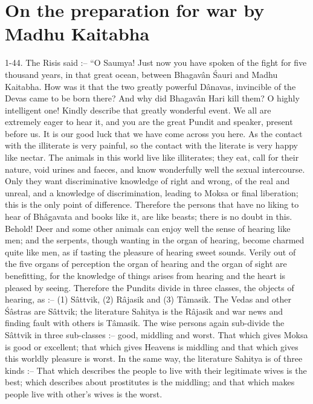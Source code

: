 \chapter{On the preparation for war by Madhu Kaitabha}

1-44. The Risis said :-- ``O Saumya! Just now you have spoken of the fight for five thousand years, in that great ocean, between Bhagav\^an \'Sauri and Madhu Kaitabha. How was it that the two greatly powerful D\^anavas, invincible of the Devas came to be born there? And why did Bhagav\^an Hari kill them? O highly intelligent one! Kindly describe that greatly wonderful event. We all are extremely eager to hear it, and you are the great Pundit and speaker, present before us. It is our good luck that we have come across you here. As the contact with the illiterate is very painful, so the contact with the literate is very happy like nectar. The animals in this world live like illiterates; they eat, call for their nature, void urines and faeces, and know wonderfully well the sexual intercourse. Only they want discriminative knowledge of right and wrong, of the real and unreal, and a knowledge of discrimination, leading to Moksa or final liberation; this is the only point of difference. Therefore the persons that have no liking to hear of Bh\^agavata and books like it, are like beasts; there is no doubt in this. Behold! Deer and some other animals can enjoy well the sense of hearing like men; and the serpents, though wanting in the organ of hearing, become charmed quite like men, as if tasting the pleasure of hearing sweet sounds. Verily out of the five organs of perception the organ of hearing and the organ of sight are benefitting, for the knowledge of things arises from hearing and the heart is pleased by seeing. Therefore the Pundits divide in three classes, the objects of hearing, as :-- (1) S\^attvik, (2) R\^ajasik and (3) T\^amasik. The Vedas and other \'S\^astras are S\^attvik; the literature Sahitya is the R\^ajasik and war news and finding fault with others is T\^amasik. The wise persons again sub-divide the S\^attvik in three sub-classes :-- good, middling and worst. That which gives Moksa is good or excellent; that which gives Heavens is middling and that which gives this worldly pleasure is worst. In the same way, the literature Sahitya is of three kinds :-- That which describes the people to live with their legitimate wives is the best; which describes about prostitutes is the middling; and that which makes people live with other's wives is the worst.

